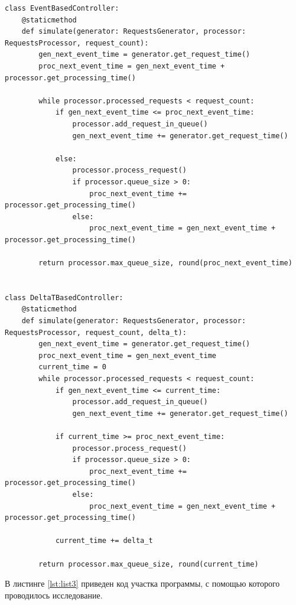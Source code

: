\documentclass[14pt, a4paper]{extarticle}
\begin{document}
\begin{lstlisting}[caption = {Код управляющих программ, основанных на принципах $\Delta t$ и событийном}, label=lst:list2]
class EventBasedController:
	@staticmethod
	def simulate(generator: RequestsGenerator, processor: RequestsProcessor, request_count):
		gen_next_event_time = generator.get_request_time()
		proc_next_event_time = gen_next_event_time + processor.get_processing_time()
		
		while processor.processed_requests < request_count:
			if gen_next_event_time <= proc_next_event_time:
				processor.add_request_in_queue()
				gen_next_event_time += generator.get_request_time()
			
			else:
				processor.process_request()
				if processor.queue_size > 0:
					proc_next_event_time += processor.get_processing_time()
				else:
					proc_next_event_time = gen_next_event_time + processor.get_processing_time()
		
		return processor.max_queue_size, round(proc_next_event_time)


class DeltaTBasedController:
	@staticmethod
	def simulate(generator: RequestsGenerator, processor: RequestsProcessor, request_count, delta_t):
		gen_next_event_time = generator.get_request_time()
		proc_next_event_time = gen_next_event_time
		current_time = 0
		while processor.processed_requests < request_count:
			if gen_next_event_time <= current_time:
				processor.add_request_in_queue()
				gen_next_event_time += generator.get_request_time()
			
			if current_time >= proc_next_event_time:
				processor.process_request()
				if processor.queue_size > 0:
					proc_next_event_time += processor.get_processing_time()
				else:
					proc_next_event_time = gen_next_event_time + processor.get_processing_time()
			
			current_time += delta_t
		
		return processor.max_queue_size, round(current_time)
\end{lstlisting}

В листинге \ref{lst:list3} приведен код участка программы, с помощью которого проводилось исследование. 
\end{document}
